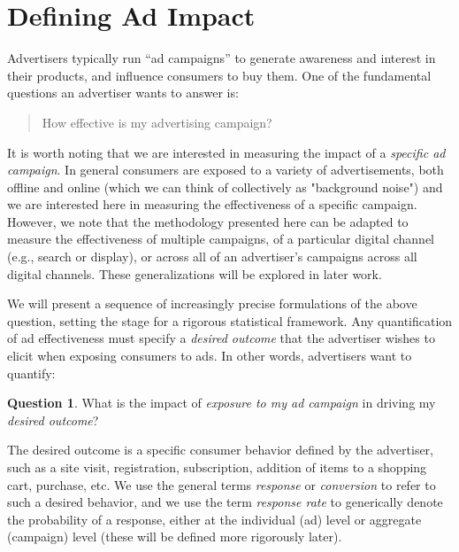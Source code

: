 \documentclass[11pt,a4paper]{article}
\theoremstyle{definition}
\theoremstyle{remark}
\theoremstyle{definition}
\theoremstyle{definition}
\theoremstyle{definition}
\newtheorem{question}{Question}[section]
\theoremstyle{definition}
\theoremstyle{definition}
\theoremstyle{definition}
\begin{document}

\section{Defining Ad Impact} \label{sec-define}

Advertisers typically run “ad campaigns” to generate awareness and interest in their products, and influence consumers to buy them. One of the fundamental questions an advertiser wants to answer is: 
\begin{quote}
How effective is my advertising campaign?	
\end{quote}


It is worth noting that we are interested in measuring the impact of a \textit{specific ad campaign}. In general consumers are exposed to a variety of advertisements, both offline and online (which we can think of collectively as "background noise") and we are interested here in measuring the effectiveness of a specific campaign. However, we note that the methodology presented here can be adapted to measure the effectiveness of multiple campaigns, of a particular digital channel (e.g., search or display), or across all of an advertiser’s campaigns across all digital channels. These generalizations will be explored in later work. 

We will present a sequence of increasingly precise formulations of the above question, setting the stage for a rigorous statistical framework. 
Any quantification of ad effectiveness must specify a {\em desired outcome} that the advertiser wishes to elicit when exposing consumers to ads. In other words, advertisers want to quantify:

\begin{question}
What is the impact of {\em exposure to my ad campaign} in driving my {\em desired outcome}? 	
\end{question}


 
The desired outcome is a specific consumer behavior defined by the advertiser, such as a site visit, registration, subscription, addition of items to a shopping cart, purchase, etc. We use the general terms {\em response} or {\em conversion} to refer to such a desired behavior, and we use the term  {\em response rate} to generically denote the probability of a response, either at the individual (ad) level or aggregate (campaign) level (these will be defined more rigorously later).
\end{document}
